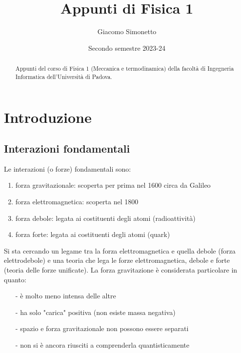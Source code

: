 \documentclass[a4paper]{article}
\title{Appunti di Fisica 1}
\author{Giacomo Simonetto}
\date{Secondo semestre 2023-24}
\begin{document}
\maketitle
\begin{abstract}
	Appunti del corso di Fisica 1 (Meccanica e termodinamica) della facoltà di Ingegneria Informatica dell'Università di Padova.
\end{abstract}

\newpage

\tableofcontents

\newpage

\section{Introduzione}
\subsection{Interazioni fondamentali}
Le interazioni (o forze) fondamentali sono:
\begin{enumerate}[topsep=3pt, itemsep=0pt]
	\item forza gravitazionale: scoperta per prima nel 1600 circa da Galileo
	\item forza elettromagnetica: scoperta nel 1800
	\item forza debole: legata ai costituenti degli atomi (radioattività)
	\item forza forte: legata ai costituenti degli atomi (quark)
\end{enumerate}
Si sta cercando un legame tra la forza elettromagnetica e quella debole (forza elettrodebole) e una teoria che lega le forze
elettromagnetica, debole e forte (teoria delle forze unificate). La forza gravitazione è considerata particolare in quanto:
\begin{itemize}[topsep=3pt, itemsep=0pt]
	\item[-] è molto meno intensa delle altre
	\item[-] ha solo "carica" positiva (non esiste massa negativa)
	\item[-] spazio e forza gravitazionale non possono essere separati
	\item[-] non si è ancora riusciti a comprenderla quantisticamente
\end{itemize}
\end{document}
